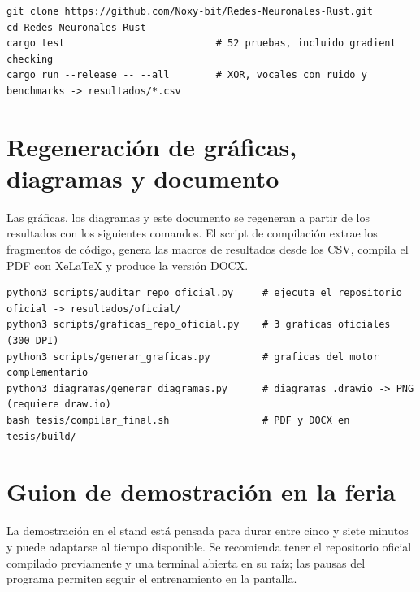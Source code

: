 \begin{lstlisting}[language={},numbers=none,caption={Pruebas y experimentos del motor complementario},label=cod:pruebas]
git clone https://github.com/Noxy-bit/Redes-Neuronales-Rust.git
cd Redes-Neuronales-Rust
cargo test                          # 52 pruebas, incluido gradient checking
cargo run --release -- --all        # XOR, vocales con ruido y benchmarks -> resultados/*.csv
\end{lstlisting}

\section{Regeneración de gráficas, diagramas y documento}
Las gráficas, los diagramas y este documento se regeneran a partir de los resultados con los siguientes comandos. El script de compilación extrae los fragmentos de código, genera las macros de resultados desde los CSV, compila el PDF con XeLaTeX y produce la versión DOCX.

\begin{lstlisting}[language={},numbers=none,caption={Regeneración de la documentación},label=cod:regenerar]
python3 scripts/auditar_repo_oficial.py     # ejecuta el repositorio oficial -> resultados/oficial/
python3 scripts/graficas_repo_oficial.py    # 3 graficas oficiales (300 DPI)
python3 scripts/generar_graficas.py         # graficas del motor complementario
python3 diagramas/generar_diagramas.py      # diagramas .drawio -> PNG (requiere draw.io)
bash tesis/compilar_final.sh                # PDF y DOCX en tesis/build/
\end{lstlisting}

\section{Guion de demostración en la feria}
La demostración en el stand está pensada para durar entre cinco y siete minutos y puede adaptarse al tiempo disponible. Se recomienda tener el repositorio oficial compilado previamente y una terminal abierta en su raíz; las pausas del programa permiten seguir el entrenamiento en la pantalla.

